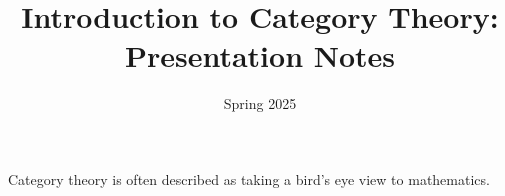 \documentclass[11pt, letterpaper]{report}
\title{Introduction to Category Theory: Presentation Notes}
\date{Spring 2025}
\begin{document}
\maketitle
Category theory is often described as taking a bird's eye view to mathematics. 
\end{document}
